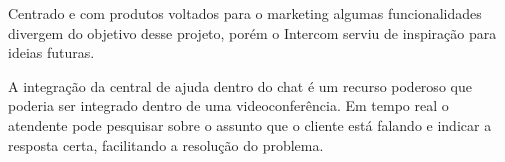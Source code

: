 Centrado e com produtos voltados para o marketing algumas funcionalidades divergem do objetivo desse projeto, porém o Intercom serviu de inspiração para ideias futuras. 

A integração da central de ajuda dentro do chat é um recurso poderoso que poderia ser integrado dentro de uma videoconferência. Em tempo real o atendente pode pesquisar sobre o assunto que o cliente está falando e indicar a resposta certa, facilitando a resolução do problema.

